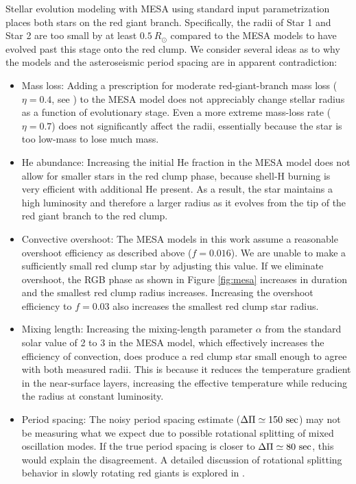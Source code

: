 Stellar evolution modeling with MESA using standard input parametrization places both stars on the red giant branch. Specifically, the radii of Star 1 and Star 2 are too small by at least $0.5 \ R_\odot$ compared to the MESA models to have evolved past this stage onto the red clump. We consider several ideas as to why the models and the asteroseismic period spacing are in apparent contradiction:
\begin{itemize}
\item Mass loss: Adding a prescription for moderate red-giant-branch mass loss ($\eta = 0.4$, see \citealt{mig12}) to the MESA model does not appreciably change stellar radius as a function of evolutionary stage. Even a more extreme mass-loss rate ($\eta = 0.7$) does not significantly affect the radii, essentially because the star is too low-mass to lose much mass.
\item He abundance: Increasing the initial He fraction in the MESA model does not allow for smaller stars in the red clump phase, because shell-H burning is very efficient with additional He present. As a result, the star maintains a high luminosity and therefore a larger radius as it evolves from the tip of the red giant branch to the red clump.
\item Convective overshoot: The MESA models in this work assume a reasonable overshoot efficiency as described above ($f = 0.016$). We are unable to make a sufficiently small red clump star by adjusting this value. If we eliminate overshoot, the RGB phase as shown in Figure \ref{fig:mesa} increases in duration and the smallest red clump radius increases. Increasing the overshoot efficiency to $f = 0.03$ also increases the smallest red clump star radius.
\item Mixing length: Increasing the mixing-length parameter $\alpha$ from the standard solar value of 2 to 3 in the MESA model, which effectively increases the efficiency of convection, does produce a red clump star small enough to agree with both measured radii. This is because it reduces the temperature gradient in the near-surface layers, increasing the effective temperature while reducing the radius at constant luminosity. 
\item Period spacing: The noisy period spacing estimate ($\Delta \Pi \simeq 150 \ \rm{sec}$) may not be measuring what we expect due to possible rotational splitting of mixed oscillation modes. If the true period spacing is closer to $\Delta \Pi \simeq 80 \ \rm{sec}$, this would explain the disagreement. A detailed discussion of rotational splitting behavior in slowly rotating red giants is explored in \citet{gou13}.
\end{itemize}

  